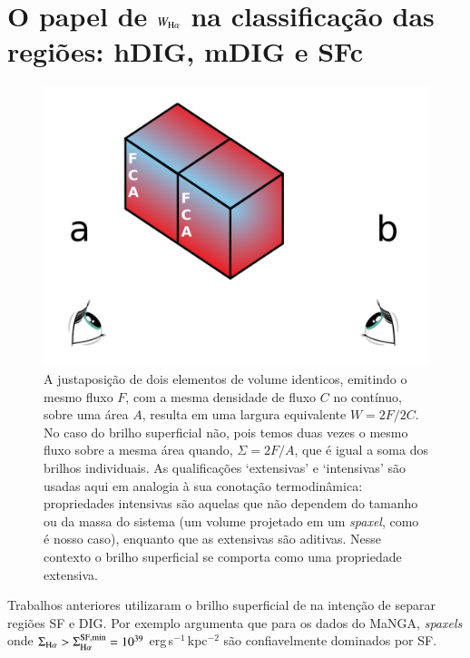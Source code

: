 \section{O papel de $W_{{\rm H}\alpha}$ na classificação das regiões: hDIG, mDIG e SFc}
\label{sec:DIGclass:WHa}

\begin{figure}
\includegraphics[scale=0.6]{figuras/cubo_com_fundo.pdf}
\caption[Intensive $\times$ extensive]
{A justaposição de dois elementos de volume identicos, emitindo o mesmo fluxo $F$, com a mesma densidade de fluxo $C$ no contínuo, sobre uma área $A$, resulta em uma largura equivalente $W = 2F/2C$. No caso do brilho superficial não, pois temos duas vezes o mesmo fluxo sobre a mesma área quando, $\Sigma = 2F/A$, que é igual a soma dos brilhos individuais. As qualificações `extensivas' e `intensivas' são usadas aqui em analogia à sua conotação termodinâmica: propriedades intensivas são aquelas que não dependem do tamanho ou da massa do sistema (um volume projetado em um {\em spaxel}, como é nosso caso), enquanto que as extensivas são aditivas. Nesse contexto o brilho superficial se comporta como uma propriedade extensiva.}
 \label{fig:intensive_vs_extensive}
\end{figure}

Trabalhos anteriores utilizaram o brilho superficial de \Ha na intenção de separar regiões SF e DIG. Por exemplo \citet{Zhang.etal.2017a} argumenta que para os dados do MaNGA, {\em spaxels} onde $\Sigma_{\Ha} > \Sigma_{\Ha}^{\rm SF,min} = 10^{39}$ erg$\,$s$^{-1}\,$kpc$^{-2}$ são confiavelmente dominados por SF.

